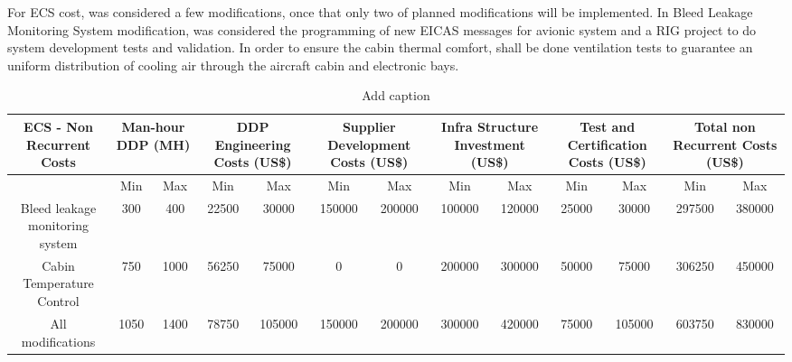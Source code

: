 For ECS cost, was considered a few modifications, once that only two of planned modifications will be implemented.
In Bleed Leakage Monitoring System modification, was considered the programming of new EICAS messages for avionic system and a RIG project to do system development tests and validation.
In order to ensure the cabin thermal comfort, shall be done ventilation tests to guarantee an uniform distribution of cooling air through the aircraft cabin and electronic bays.


\begin{table}[htbp]
  \centering
  \caption{Add caption}
    \begin{tabular}{ccccccccccccc}
    \toprule
    \multirow{2}[4]{*}{ECS - Non Recurrent Costs} & \multicolumn{2}{c}{Man-hour DDP (MH)} & \multicolumn{2}{c}{DDP Engineering Costs (US\$)} & \multicolumn{2}{c}{Supplier Development Costs (US\$)} & \multicolumn{2}{c}{Infra Structure Investment (US\$)} & \multicolumn{2}{c}{Test and Certification Costs (US\$)} & \multicolumn{2}{c}{Total non Recurrent Costs (US\$)} \\
    \midrule
          & Min   & Max   & Min   & Max   & Min   & Max   & Min   & Max   & Min   & Max   & Min   & Max \\
    Bleed leakage monitoring system & 300   & 400   & 22500 & 30000 & 150000 & 200000 & 100000 & 120000 & 25000 & 30000 & 297500 & 380000 \\
    Cabin Temperature Control & 750   & 1000  & 56250 & 75000 & 0     & 0     & 200000 & 300000 & 50000 & 75000 & 306250 & 450000 \\
    All modifications & 1050  & 1400  & 78750 & 105000 & 150000 & 200000 & 300000 & 420000 & 75000 & 105000 & 603750 & 830000 \\
    \bottomrule
    \end{tabular}%
  \label{tab:addlabel}%
\end{table}%



